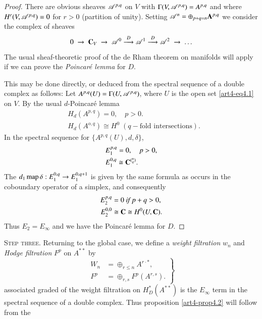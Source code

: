 \begin{proof}
There are obvious sheaves $\mathscr{A}^{p,q}$ on $V$ with $\Gamma (V, \mathscr{A}^{p,q}) = A^{p,q}$ and where $H^r (V, \mathscr{A}^{p,q}) = 0$ for $r >0$ (partition of unity). Setting $\mathscr{A}^n = \oplus_{p+q=n} \mathbf{A}^{p,q}$ we consider the complex of sheaves
$$
0 \; \to \; \mathbf{C}_V  \; \to  \; \mathscr{A}^0 \; {\displaystyle{\mathop{\longrightarrow}^D}} \; \mathscr{A}^1  \; {\displaystyle{\mathop{\longrightarrow}^D}} \; \mathscr{A}^2 \; \to \; \ldots
$$
The usual sheaf-theoretic proof of the de Rham theorem on manifolds will apply if we can prove the \textit{Poincar\'e lemma} for $D$.

This may be done directly, or deduced from the spectral sequence of a double complex as follows: Let $A^{p,q} (U) = \Gamma (U, \mathscr{A}^{p,q})$, where $U$ is the open set \eqref{art4-eq4.1} on $V$. By the usual $d$-Poincar\'e lemma
\begin{align*}
& H_d (A^{p,q}) = 0, \quad p > 0.\\
& H_d (A^{o,q}) \cong H^0 \; (q-\text{fold intersections}).
\end{align*}
In the spectral sequence for $\{A^{p,q} (U), d, \delta\}$,
\begin{align*}
& E^{p,q}_1 = 0, \quad p>0,\\
& E^{0,q}_1 \cong \mathbf{C}^{(^n_q)}. 
\end{align*}
The $d_1 \operatorname{map} \delta : E^{0,q}_1 \to E^{0,q+1}_1$ is given by the same formula as occurs in the coboundary operator of a simplex, and consequently
\begin{align*} 
E^{p,q}_2 & = 0 \textit{ if } p + q > 0,\\
E^{0,0}_2 & \cong \mathbf{C} \cong H^0 (U,\mathbf{C}).
\end{align*}
Thus $E_2 = E_\infty$ and we have the Poincar\'e lemma for $D$.
\end{proof}

\medskip
\textsc{Step three.} Returning to the global case, we define a \textit{weight filtration} $w_n$ and \textit{Hodge filtration} $F^p$ on $A^{\ast\ast}$ by
\begin{equation}
\left.
\begin{aligned}
W_n & = \oplus_{r\leqslant n} A^{r \cdot \ast},\\
F^p & = \oplus_{r,s} F^p (A^{r,s}). 
\end{aligned}
\right\} \label{art4-eq4.7}
\end{equation}\pageoriginale
associated graded of the weight filtration on $H^\ast_D(A^{\ast\ast})$ is the $E_\infty$ term in the spectral sequence of a double complex. Thus proposition \eqref{art4-prop4.2} will follow from the

